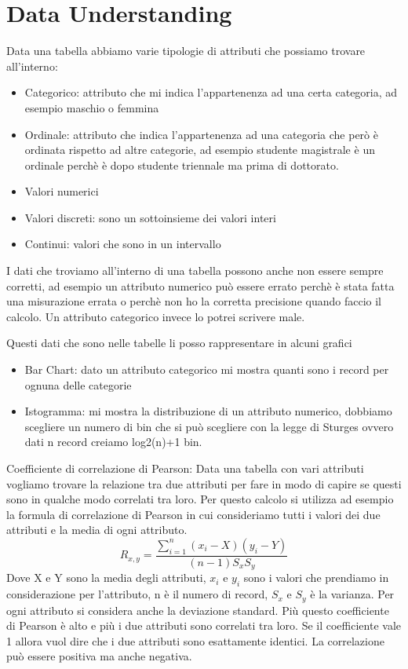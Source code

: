 \documentclass[14pt]{extreport}
\begin{document}
\chapter{Data Understanding}

Data una tabella abbiamo varie tipologie di attributi che possiamo trovare all'interno:
\begin{itemize}
\item Categorico: attributo che mi indica l'appartenenza ad una certa categoria, ad esempio maschio o femmina
\item Ordinale: attributo che indica l'appartenenza ad una categoria che però è ordinata rispetto ad altre categorie, ad esempio studente magistrale è un ordinale perchè è dopo studente triennale ma prima di dottorato.
\item Valori numerici
\item Valori discreti: sono un sottoinsieme dei valori interi
\item Continui: valori che sono in un intervallo
\end{itemize}

I dati che troviamo all'interno di una tabella possono anche non essere sempre corretti, ad esempio un attributo numerico può essere errato perchè è stata fatta una misurazione errata o perchè non ho la corretta precisione quando faccio il calcolo. Un attributo categorico invece lo potrei scrivere male.

Questi dati che sono nelle tabelle li posso rappresentare in alcuni grafici

\begin{itemize}
\item Bar Chart: dato un attributo categorico mi mostra quanti sono i record per ognuna delle categorie
\item Istogramma: mi mostra la distribuzione di un attributo numerico, dobbiamo scegliere un numero di bin che si può scegliere con la legge di Sturges ovvero dati n record creiamo log2(n)+1 bin.
\end{itemize}

Coefficiente di correlazione di Pearson:
\newline
Data una tabella con vari attributi vogliamo trovare la relazione tra due attributi per fare in modo di capire se questi sono in qualche modo correlati tra loro.
Per questo calcolo si utilizza ad esempio la formula di correlazione di Pearson in cui consideriamo tutti i valori dei due attributi e la media di ogni attributo. 
\begin{equation}
R_{x,y} = \frac{\sum\limits_{i=1}^{n} (x_i-X)(y_i-Y)}{(n-1)S_x S_y}
\end{equation}
Dove X e Y sono la media degli attributi, $x_i$ e $y_i$ sono i valori che prendiamo in considerazione per l'attributo, n è il numero di record, $S_x$ e $S_y$ è la varianza.
Per ogni attributo si considera anche la deviazione standard. Più questo coefficiente di Pearson è alto e più i due attributi sono correlati tra loro.
Se il coefficiente vale 1 allora vuol dire che i due attributi sono esattamente identici.
La correlazione può essere positiva ma anche negativa.
\end{document}
